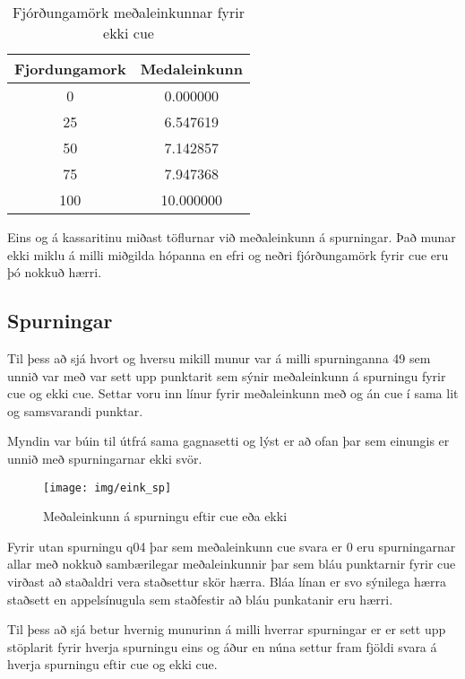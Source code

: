 \documentclass[
  10pt,
]{article}
\begin{document}
\begin{table}[!h]

\caption{\label{tab:unnamed-chunk-6}\label{tab:strings} Fjórðungamörk meðaleinkunnar fyrir ekki cue}
\centering
\begin{tabular}[t]{cc}
\toprule
\textbf{Fjordungamork} & \textbf{Medaleinkunn}\\
\midrule
0 & 0.000000\\
25 & 6.547619\\
50 & 7.142857\\
75 & 7.947368\\
100 & 10.000000\\
\bottomrule
\end{tabular}
\end{table}

Eins og á kassaritinu miðast töflurnar við meðaleinkunn á spurningar. Það munar ekki miklu á milli miðgilda hópanna en efri og neðri fjórðungamörk fyrir cue eru þó nokkuð hærri.

\newpage

\hypertarget{spurningar}{%
\subsection{Spurningar}\label{spurningar}}

Til þess að sjá hvort og hversu mikill munur var á milli spurninganna 49 sem unnið var með var sett upp punktarit sem sýnir meðaleinkunn á spurningu fyrir cue og ekki cue. Settar voru inn línur fyrir meðaleinkunn með og án cue í sama lit og samsvarandi punktar.

Myndin var búin til útfrá sama gagnasetti og lýst er að ofan þar sem einungis er unnið með spurningarnar ekki svör.

\begin{figure}[H]

{\centering \texttt{[image: img/eink\_sp]} 

}

\caption{Meðaleinkunn á spurningu eftir cue eða ekki}\label{fig:mynd2}
\end{figure}

Fyrir utan spurningu q04 þar sem meðaleinkunn cue svara er 0 eru spurningarnar allar með nokkuð sambærilegar meðaleinkunnir þar sem bláu punktarnir fyrir cue virðast að staðaldri vera staðsettur skör hærra. Bláa línan er svo sýnilega hærra staðsett en appelsínugula sem staðfestir að bláu punkatanir eru hærri.

Til þess að sjá betur hvernig munurinn á milli hverrar spurningar er er sett upp stöplarit fyrir hverja spurningu eins og áður en núna settur fram fjöldi svara á hverja spurningu eftir cue og ekki cue.
\end{document}
